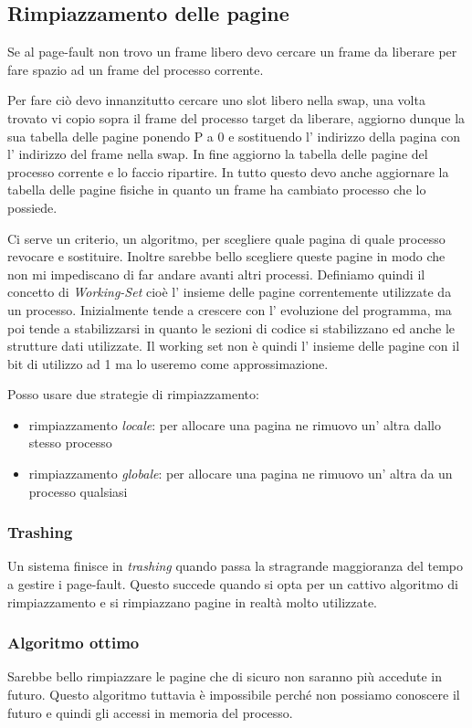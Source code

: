 \subsection{Rimpiazzamento delle pagine}
Se al page-fault non trovo un frame libero devo cercare un frame da liberare per fare spazio ad un frame del processo corrente.

Per fare ciò devo innanzitutto cercare uno slot libero nella swap, una volta trovato vi copio sopra il frame del processo target da liberare, aggiorno dunque la sua tabella delle pagine ponendo P a 0 e sostituendo l' indirizzo della pagina con l' indirizzo del frame nella swap.
In fine aggiorno la tabella delle pagine del processo corrente e lo faccio ripartire.
In tutto questo devo anche aggiornare la tabella delle pagine fisiche in quanto un frame ha cambiato processo che lo possiede.

Ci serve un criterio, un algoritmo, per scegliere quale pagina di quale processo revocare e sostituire.
Inoltre sarebbe bello scegliere queste pagine in modo che non mi impediscano di far andare avanti altri processi.
Definiamo quindi il concetto di \emph{Working-Set} cioè l' insieme delle pagine correntemente utilizzate da un processo.
Inizialmente tende a crescere con l' evoluzione del programma, ma poi tende a stabilizzarsi in quanto le sezioni di codice si stabilizzano ed anche le strutture dati utilizzate.
Il working set non è quindi l' insieme delle pagine con il bit di utilizzo ad 1 ma lo useremo come approssimazione.

Posso usare due strategie di rimpiazzamento:
\begin{itemize}
    \item rimpiazzamento \emph{locale}: per allocare una pagina ne rimuovo un' altra dallo stesso processo
    \item rimpiazzamento \emph{globale}: per allocare una pagina ne rimuovo un' altra da un processo qualsiasi
\end{itemize}

\subsubsection{Trashing}
Un sistema finisce in \emph{trashing} quando passa la stragrande maggioranza del tempo a gestire i page-fault.
Questo succede quando si opta per un cattivo algoritmo di rimpiazzamento e si rimpiazzano pagine in realtà molto utilizzate.

\subsubsection{Algoritmo ottimo}
Sarebbe bello rimpiazzare le pagine che di sicuro non saranno più accedute in futuro.
Questo algoritmo tuttavia è impossibile perché non possiamo conoscere il futuro e quindi gli accessi in memoria del processo.

